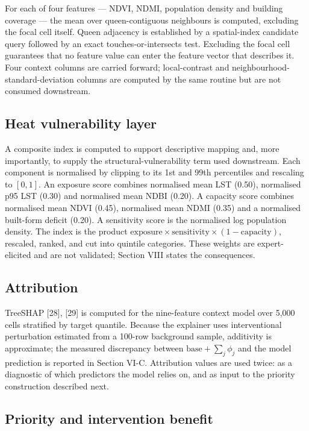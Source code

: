 \documentclass[conference]{IEEEtran}
\begin{document}
For each of four features --- NDVI, NDMI, population density and building coverage --- the mean over
queen-contiguous neighbours is computed, excluding the focal cell itself. Queen adjacency is
established by a spatial-index candidate query followed by an exact touches-or-intersects test.
Excluding the focal cell guarantees that no feature value can enter the feature vector that describes
it. Four context columns are carried forward; local-contrast and neighbourhood-standard-deviation
columns are computed by the same routine but are not consumed downstream.

\subsection{Heat vulnerability layer}\label{e.-heat-vulnerability-layer}

A composite index is computed to support descriptive mapping and, more importantly, to supply the
structural-vulnerability term used downstream. Each component is normalised by clipping to its 1st
and 99th percentiles and rescaling to \([0, 1]\). An exposure score combines normalised mean LST (0.50),
normalised p95 LST (0.30) and normalised mean NDBI (0.20). A capacity score combines normalised mean
NDVI (0.45), normalised mean NDMI (0.35) and a normalised built-form deficit (0.20). A sensitivity
score is the normalised log population density. The index is the product
\(\mathrm{exposure} \times \mathrm{sensitivity} \times (1 - \mathrm{capacity})\), rescaled, ranked, and
cut into quintile categories. These weights are expert-elicited and are not validated; Section VIII
states the consequences.

\subsection{Attribution}\label{f.-attribution}

TreeSHAP {[}28{]}, {[}29{]} is computed for the nine-feature context model over 5,000 cells stratified by
target quantile. Because the explainer uses interventional perturbation estimated from a 100-row
background sample, additivity is approximate; the measured discrepancy between
\(\mathrm{base} + \sum_j \phi_j\) and the model prediction is reported in Section VI-C. Attribution
values are used twice: as a diagnostic of which predictors the model relies on, and as input to the
priority construction described next.

\subsection{Priority and intervention benefit}\label{g.-priority-and-intervention-benefit}
\end{document}

